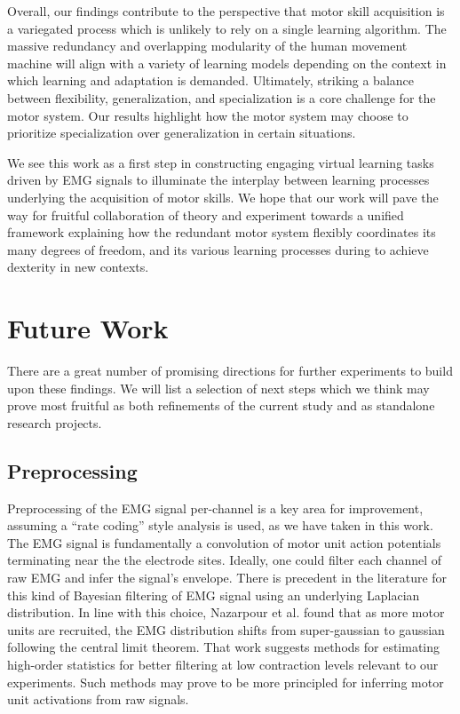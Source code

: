 \documentclass[../main.tex]{subfiles}
\begin{document}
Overall, our findings contribute to the perspective that motor skill acquisition is a variegated process which is unlikely to rely on a single learning algorithm. The massive redundancy and overlapping modularity of the human movement machine will align with a variety of learning models depending on the context in which learning and adaptation is demanded. Ultimately, striking a balance between flexibility, generalization, and specialization is a core challenge for the motor system. Our results highlight how the motor system may choose to prioritize specialization over generalization in certain situations. 

We see this work as a first step in constructing engaging virtual learning tasks driven by EMG signals to illuminate the interplay between learning processes underlying the acquisition of motor skills. We hope that our work will pave the way for fruitful collaboration of theory and experiment towards a unified framework explaining how the redundant motor system flexibly coordinates its many degrees of freedom, and its various learning processes during to achieve dexterity in new contexts.












\section{Future Work} %

There are a great number of promising directions for further experiments to build upon these findings. We will list a selection of next steps which we think may prove most fruitful as both refinements of the current study and as standalone research projects.


\subsection{Preprocessing}

Preprocessing of the EMG signal per-channel is a key area for improvement, assuming a ``rate coding'' style analysis is used, as we have taken in this work. The EMG signal is fundamentally a convolution of motor unit action potentials terminating near the the electrode sites. Ideally, one could filter each channel of raw EMG and infer the signal's envelope. There is precedent in the literature for this kind of Bayesian filtering of EMG signal using an underlying Laplacian distribution\cite{sangerBayesianFilteringMyoelectric2007}. In line with this choice, Nazarpour et al. found that as more motor units are recruited, the EMG distribution shifts from super-gaussian to gaussian following the central limit theorem\cite{nazarpourNoteProbabilityDistribution2013}. That work suggests methods for estimating high-order statistics for better filtering at low contraction levels relevant to our experiments. Such methods may prove to be more principled for inferring motor unit activations from raw signals.
\end{document}
